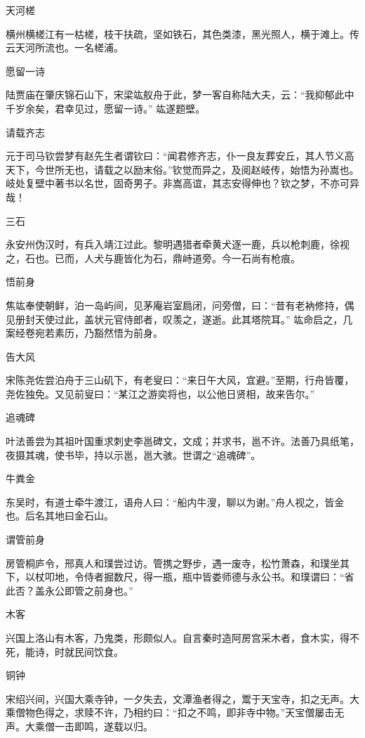 \documentclass[a4paper,12pt,UTF8,twoside]{ctexbook}
\begin{document}
    天河槎
    
    横州横槎江有一枯槎，枝干扶疏，坚如铁石，其色类漆，黑光照人，横于滩上。传云天河所流也。一名槎浦。
    
    愿留一诗
    
    陆贾庙在肇庆锦石山下，宋梁竑舣舟于此，梦一客自称陆大夫，云：“我抑郁此中千岁余矣，君幸见过，愿留一诗。” 竑遂题壁。
    
    请载齐志
    
    元于司马钦尝梦有赵先生者谓钦曰：“闻君修齐志，仆一良友葬安丘，其人节义高天下，今世所无也，请载之以励末俗。”钦觉而异之，及阅赵岐传，始悟为孙嵩也。岐处复壁中著书以名世，固奇男子。非嵩高谊，其志安得伸也？钦之梦，不亦可异哉！
    
    三石
    
    永安州伪汉时，有兵入靖江过此。黎明遇猎者牵黄犬逐一鹿，兵以枪刺鹿，徐视之，石也。已而，人犬与鹿皆化为石，鼎峙道旁。今一石尚有枪痕。
    
    悟前身
    
    焦竑奉使朝鲜，泊一岛屿间，见茅庵岩室扃闭，问旁僧，曰：“昔有老衲修持，偶见册封天使过此，盖状元官侍郎者，叹羡之，遂逝。此其塔院耳。” 竑命启之，几案经卷宛若素历，乃豁然悟为前身。
    
    告大风
    
    宋陈尧佐尝泊舟于三山矶下，有老叟曰：“来日午大风，宜避。”至期，行舟皆覆，尧佐独免。又见前叟曰：“某江之游奕将也，以公他日贤相，故来告尔。”
    
    追魂碑
    
    叶法善尝为其祖叶国重求刺史李邕碑文，文成；并求书，邕不许。法善乃具纸笔，夜摄其魂，使书毕，持以示邕，邕大骇。世谓之“追魂碑”。
    
    牛粪金
    
    东吴时，有道士牵牛渡江，语舟人曰：“船内牛溲，聊以为谢。”舟人视之，皆金也。后名其地曰金石山。
    
    谓管前身
    
    房管桐庐令，邢真人和璞尝过访。管携之野步，遇一废寺，松竹萧森，和璞坐其下，以杖叩地，令侍者掘数尺，得一瓶，瓶中皆娄师德与永公书。和璞谓曰：“省此否？盖永公即管之前身也。”
    
    木客
    
    兴国上洛山有木客，乃鬼类，形颇似人。自言秦时造阿房宫采木者，食木实，得不死，能诗，时就民间饮食。
    
    铜钟
    
    宋绍兴间，兴国大乘寺钟，一夕失去，文潭渔者得之，鬻于天宝寺，扣之无声。大乘僧物色得之，求赎不许，乃相约曰：“扣之不鸣，即非寺中物。”天宝僧屡击无声。大乘僧一击即鸣，遂载以归。
    
\end{document}
